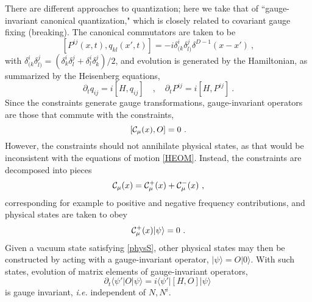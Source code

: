 \documentclass[12pt]{article}
\numberwithin{equation}{section}
\newcommand{\calC}{{\cal C}}
\newcommand{\beq}{\begin{equation}}
\newcommand{\eeq}{\end{equation}}
\begin{document}
There are different approaches to quantization; here we take that of ``gauge-invariant canonical quantization," which is closely related to covariant gauge fixing (breaking)\cite{GiPe2}.  The canonical commutators are taken to be
\beq\label{ccrq}
[P^{ij}(x,t),q_{kl}(x',t)] = -i\delta^i_{(k}\delta^j_{l)}  \delta^{D-1}(x-x')\ ,
\eeq
with $\delta^i_{(k}\delta^j_{l)}=(\delta^i_{k}\delta^j_{l} + \delta^i_l\delta^j_{k})/2$, and evolution is generated by the Hamiltonian, as summarized by the Heisenberg equations,
\beq\label{HEOM}
\partial_t q_{ij} = i [H,q_{ij}]\quad ,\quad \partial_t P^{ij} = i [H,P^{ij}]\ .
\eeq
Since the constraints generate gauge transformations, gauge-invariant operators are those that commute with the constraints,
\beq\label{concomm}
[\calC_\mu(x),O]=0\ .
\eeq
However, the constraints should not annihilate physical states, as that would be inconsistent with the equations of motion \eqref{HEOM}.  Instead, the constraints are decomposed into pieces
 \beq\label{condec}
\calC_\mu(x)= \calC_\mu^+(x) + \calC_\mu^-(x)\ ,
\eeq
corresponding for example to positive and negative frequency contributions, and physical states are taken to obey
\beq\label{physS}
\calC_\mu^+(x)|\psi\rangle=0\ .
\eeq
Given a vacuum state satisfying \eqref{physS}, other physical states may then be constructed by acting with a gauge-invariant operator, $|\psi\rangle = O|0\rangle$.  With such states, evolution of matrix elements of gauge-invariant operators, 
\beq\label{MEevo}
\partial_t \langle \psi'|O |\psi\rangle = i\langle \psi'|[H,O]|\psi\rangle\ 
\eeq
is gauge invariant, {\it i.e.} independent of $N, N^i$.  
\end{document}
